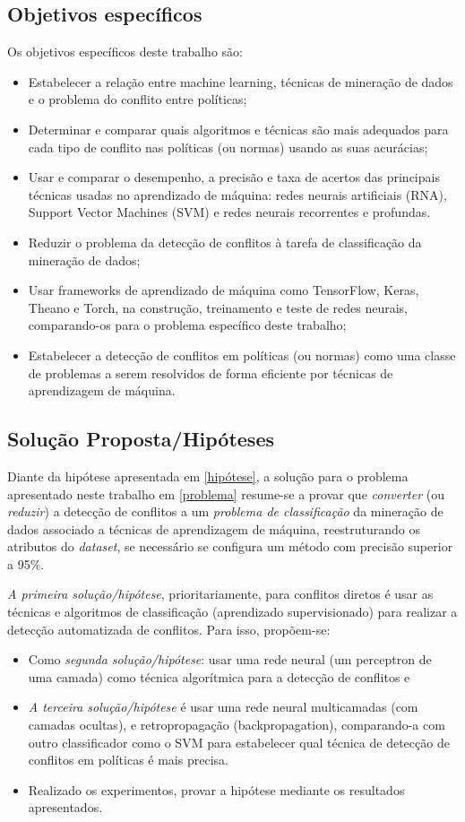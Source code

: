 \subsection{Objetivos específicos}
Os objetivos específicos deste trabalho são:
\begin{itemize}	
	\item Estabelecer a relação entre machine learning, técnicas de mineração de dados e o problema do conflito entre políticas;
	\item Determinar e comparar quais algoritmos e técnicas são mais adequados para cada tipo de conflito nas políticas (ou normas) usando as suas acurácias;
	\item Usar e comparar o desempenho, a precisão e taxa de acertos das principais técnicas usadas no aprendizado de máquina: redes neurais artificiais (RNA), Support Vector Machines (SVM) e redes neurais recorrentes e profundas.
	\item Reduzir o problema da detecção de conflitos à tarefa de classificação da mineração de dados;
	\item Usar frameworks de aprendizado de máquina como TensorFlow, Keras, Theano e Torch, na construção, treinamento e teste de redes neurais, comparando-os para o problema específico deste trabalho;
	\item Estabelecer a detecção de conflitos em políticas (ou normas) como uma  classe de problemas a serem resolvidos de forma eficiente por técnicas de aprendizagem de máquina.
\end{itemize}


\subsection{Solução Proposta/Hipóteses}\label{solucao_proposta}
Diante da hipótese apresentada em \ref{hipótese}, a solução para o problema apresentado neste trabalho em \ref{problema} resume-se a provar que \textit{converter} (ou \textit{reduzir}) a detecção de conflitos a um \textit{problema de classificação} da mineração de dados associado a técnicas de aprendizagem de máquina, reestruturando os atributos do \textit{dataset}, se necessário se configura um método com precisão superior a 95\%. 

\textit{A primeira solução/hipótese}, prioritariamente, para conflitos diretos é usar as técnicas e algoritmos de classificação (aprendizado supervisionado) para  realizar a detecção automatizada de conflitos. Para isso, propõem-se:
\begin{itemize}
	\item Como \textit{segunda solução/hipótese}: usar uma rede neural (um perceptron de uma camada) como técnica algorítmica para a detecção de conflitos e
	\item \textit{A terceira solução/hipótese} é usar uma rede neural multicamadas (com camadas ocultas), e retropropagação (backpropagation), comparando-a com outro classificador como o SVM para estabelecer qual técnica de detecção de conflitos em políticas é mais precisa.
	\item Realizado os experimentos, provar a hipótese mediante os resultados apresentados.
\end{itemize}

